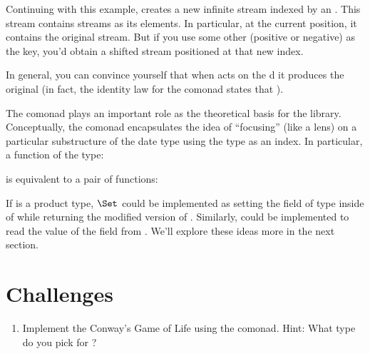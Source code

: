 Continuing with this example,  creates a new infinite
stream indexed by an . This stream contains streams as its
elements. In particular, at the current position, it contains the
original stream. But if you use some other  (positive or
negative) as the key, you'd obtain a shifted stream positioned at that
new index.

In general, you can convince yourself that when  acts on
the d  it produces the original
 (in fact, the identity law for the comonad states that
).

The  comonad plays an important role as the theoretical
basis for the  library. Conceptually, the
 comonad encapsulates the idea of ``focusing'' (like
a lens) on a particular substructure of the date type  using
the type  as an index. In particular, a function of the type:

is equivalent to a pair of functions:

If  is a product type, $\Set$ could be implemented as
setting the field of type  inside of  while
returning the modified version of . Similarly, 
could be implemented to read the value of the  field from
. We'll explore these ideas more in the next section.

\section{Challenges}

\begin{enumerate}
\tightlist
\item
  Implement the Conway's Game of Life using the  comonad.
  Hint: What type do you pick for ?
\end{enumerate}
